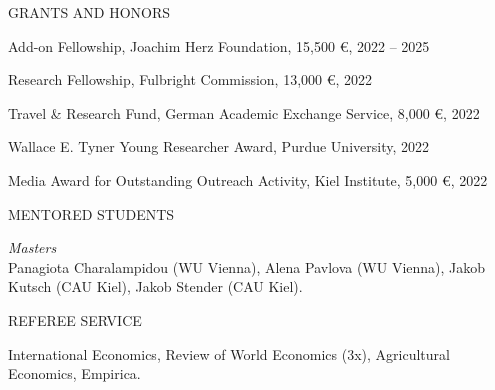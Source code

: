 \documentclass{article}
\begin{document}
\begin{minipage}[t]{0.12\textwidth}
    {\selectfont GRANTS AND HONORS} \\
\end{minipage}
\hspace{5mm}
\begin{minipage}[t]{0.8\textwidth}
    Add-on Fellowship, Joachim Herz Foundation, 15,500 \euro{}, 2022 -- 2025 \par
    Research Fellowship, Fulbright Commission, 13,000 \euro{}, 2022 \par
    Travel \& Research Fund, German Academic Exchange Service, 8,000 \euro{}, 2022 \par
    Wallace E. Tyner Young Researcher Award, Purdue University, 2022 \par
    Media Award for Outstanding Outreach Activity, Kiel Institute, 5,000 \euro{}, 2022 \par
\end{minipage}
\medskip


\begin{minipage}[t]{0.12\textwidth}
    {\selectfont MENTORED STUDENTS} \\
\end{minipage}
\hspace{5mm}
\begin{minipage}[t]{0.8\textwidth}
    \textit{Masters} \\
    Panagiota Charalampidou (WU Vienna), Alena Pavlova (WU Vienna), Jakob Kutsch (CAU Kiel), Jakob Stender (CAU Kiel).
\end{minipage}
\medskip


\begin{minipage}[t]{0.12\textwidth}
    {\selectfont REFEREE SERVICE} \\
\end{minipage}
\hspace{5mm}
\begin{minipage}[t]{0.8\textwidth}
    International Economics, Review of World Economics (3x), Agricultural Economics, Empirica.
\end{minipage}
\medskip

\end{document}
